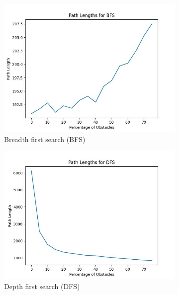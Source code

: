 \documentclass{article}
\begin{document}
\begin{figure}[H]
    \centering
    \begin{subfigure}{0.325\textwidth}
        \centering
        \includegraphics[width = \textwidth]{plots/BFS_paths.jpg}
        \caption{Breadth first search (BFS)}
    \end{subfigure}
    \begin{subfigure}{0.325\textwidth}
        \centering
        \includegraphics[width = \textwidth]{plots/DFS_paths.jpg}
        \caption{Depth first search (DFS)}
    \end{subfigure}
    \begin{subfigure}{0.325\textwidth}
        \centering

\end{subfigure}
\end{figure}
\end{document}
